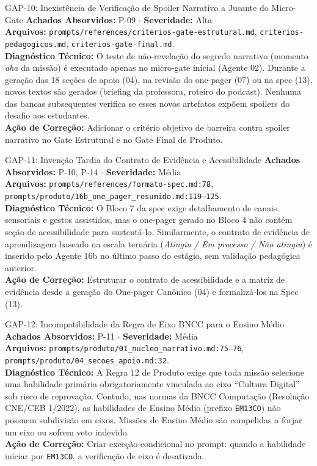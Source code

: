 \documentclass[11pt,a4paper]{article}
\begin{document}
\begin{gapbox}{GAP-10: Inexistência de Verificação de Spoiler Narrativo a Jusante do Micro-Gate}
\textbf{Achados Absorvidos:} P-09 $\cdot$ \textbf{Severidade:} Alta\\
\textbf{Arquivos:} \texttt{prompts/references/criterios-gate-estrutural.md}, \texttt{criterios-pedagogicos.md}, \texttt{criterios-gate-final.md}.\\
\textbf{Diagnóstico Técnico:} O teste de não-revelação do segredo narrativo (momento \textit{aha} da missão) é executado apenas no micro-gate inicial (Agente 02). Durante a geração das 18 seções de apoio (04), na revisão do one-pager (07) ou na spec (13), novos textos são gerados (briefing da professora, roteiro do podcast). Nenhuma das bancas subsequentes verifica se esses novos artefatos expõem spoilers do desafio aos estudantes.\\
\textbf{Ação de Correção:} Adicionar o critério objetivo de barreira contra spoiler narrativo no Gate Estrutural e no Gate Final de Produto.
\end{gapbox}

\begin{gapbox}{GAP-11: Invenção Tardia do Contrato de Evidência e Acessibilidade}
\textbf{Achados Absorvidos:} P-10, P-14 $\cdot$ \textbf{Severidade:} Média\\
\textbf{Arquivos:} \texttt{prompts/references/formato-spec.md:78}, \texttt{prompts/produto/16b\_one\_pager\_resumido.md:119--125}.\\
\textbf{Diagnóstico Técnico:} O Bloco 7 da spec exige detalhamento de canais sensoriais e gestos assistidos, mas o one-pager gerado no Bloco 4 não contém seção de acessibilidade para sustentá-lo. Similarmente, o contrato de evidência de aprendizagem baseado na escala ternária (\textit{Atingiu / Em processo / Não atingiu}) é inserido pelo Agente 16b no último passo do estágio, sem validação pedagógica anterior.\\
\textbf{Ação de Correção:} Estruturar o contrato de acessibilidade e a matriz de evidência desde a geração do One-pager Canônico (04) e formalizá-los na Spec (13).
\end{gapbox}

\begin{gapbox}{GAP-12: Incompatibilidade da Regra de Eixo BNCC para o Ensino Médio}
\textbf{Achados Absorvidos:} P-11 $\cdot$ \textbf{Severidade:} Média\\
\textbf{Arquivos:} \texttt{prompts/produto/01\_nucleo\_narrativo.md:75--76}, \texttt{prompts/produto/04\_secoes\_apoio.md:32}.\\
\textbf{Diagnóstico Técnico:} A Regra 12 de Produto exige que toda missão selecione uma habilidade primária obrigatoriamente vinculada ao eixo ``Cultura Digital'' sob risco de reprovação. Contudo, nas normas da BNCC Computação (Resolução CNE/CEB 1/2022), as habilidades de Ensino Médio (prefixo \texttt{EM13CO}) não possuem subdivisão em eixos. Missões de Ensino Médio são compelidas a forjar um eixo ou sofrem veto indevido.\\
\textbf{Ação de Correção:} Criar exceção condicional no prompt: quando a habilidade iniciar por \texttt{EM13CO}, a verificação de eixo é desativada.
\end{gapbox}
\end{document}
